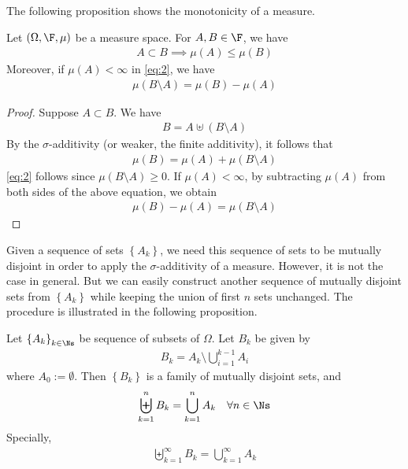 \documentclass[thmcnt=section, 12pt]{elegantbook}
\begin{document}

\par The following proposition shows the monotonicity of a measure.

\begin{proposition} \label{pro:2}
    Let $(\Omega, \F, \mu)$ be a measure space. For $A, B \in \F$, we have
    \begin{align}
        A \subset B \implies \mu(A) \leq \mu(B)
        \label{eq:2}
    \end{align}
    Moreover, if $\mu(A) < \infty$ in \eqref{eq:2}, we have 
    \begin{align*}
        \mu(B \setminus A) = \mu(B) - \mu(A)
    \end{align*}
\end{proposition}

\begin{proof}
    Suppose $A \subset B$. We have 
    \begin{align*}
        B = A \uplus (B \setminus A)
    \end{align*}
    By the $\sigma$-additivity (or weaker, the finite additivity), it follows that 
    \begin{align*}
        \mu(B) = \mu(A) + \mu(B \setminus A)
    \end{align*}
    \eqref{eq:2} follows since $\mu(B \setminus A) \geq 0$. If $\mu(A) < \infty$, by subtracting $\mu(A)$ from both sides of the above equation, we obtain
    \begin{align*}
        \mu(B) - \mu(A) = \mu(B \setminus A)
    \end{align*}
\end{proof}


\par Given a sequence of sets $\left\{A_k\right\}$, we need this sequence of sets to be mutually disjoint in order to apply the $\sigma$-additivity of a measure. However, it is not the case in general. But we can easily construct another sequence of mutually disjoint sets from $\left\{A_k\right\}$ while keeping the union of first $n$ sets unchanged. The procedure is illustrated in the following proposition.

\begin{proposition} \label{pro:1}
    Let $\left\{A_k\right\}_{k\in\Ns}$ be sequence of subsets of $\Omega$. Let $B_k$ be given by 
    \begin{align*}
        B_k = A_k \setminus \bigcup_{i=1}^{k-1} A_i
    \end{align*}
    where $A_0 := \emptyset$. Then $\left\{ B_k \right\}$ is a family of mutually disjoint sets, and 
    \begin{align*}
        \biguplus_{k=1}^n B_k 
        = \bigcup_{k=1}^n A_k
        \quad \forall n \in \Ns
    \end{align*}
    Specially, 
    \begin{align*}
        \biguplus_{k=1}^\infty B_k 
        = \bigcup_{k=1}^\infty A_k
    \end{align*}
\end{proposition}
\end{document}
